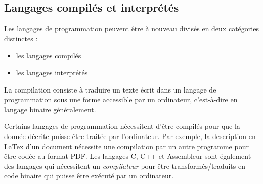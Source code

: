 \documentclass[../../main.tex]{subfiles}
\begin{document}
\subsection{Langages compilés et interprétés} \label{sub:langages_compil_s_et_interpr_t_s}
Les langages de programmation peuvent être à nouveau divisés en deux catégories distinctes :
\begin{itemize}
	\item les langages compilés
	\item les langages interprétés
\end{itemize}
La compilation consiste à traduire un texte écrit dans un langage de programmation sous une forme accessible par un ordinateur, c'est-à-dire en langage binaire généralement.

Certains langages de programmation nécessitent d'être compilés pour que la donnée décrite puisse être traitée par l'ordinateur. Par exemple, la description en LaTex d'un document nécessite une compilation par un autre programme pour être codée au format PDF. Les langages C, C++ et Assembleur sont également des langages qui nécessitent un \textit{compilateur} pour être transformés/traduits en code binaire qui puisse être exécuté par un ordinateur.
\end{document}

